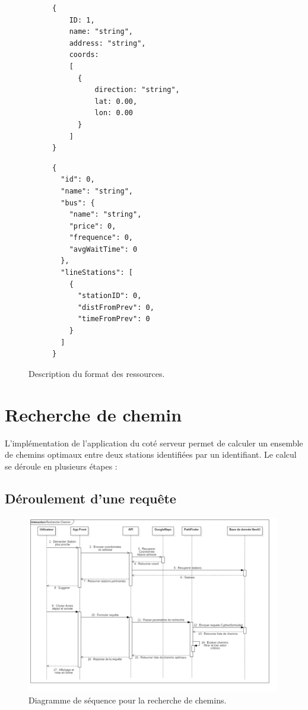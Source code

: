 \begin{figure}[h!]
	\begin{subfigure}[b]{0.45\linewidth}
		\begin{lstlisting}[caption=Format JSON de Station]
{
	ID: 1,
	name: "string",
	address: "string",
	coords: 
	[
	  {
	  	  direction: "string",
  		  lat: 0.00,
   		  lon: 0.00
	  }
	]
}
		\end{lstlisting}
	\end{subfigure}\hfill%
	\begin{subfigure}[b]{0.45\linewidth}
		\begin{lstlisting}[caption=Format JSON de Line]
{
  "id": 0,
  "name": "string",
  "bus": {
    "name": "string",
    "price": 0,
    "frequence": 0,
    "avgWaitTime": 0
  },
  "lineStations": [
    {
      "stationID": 0,
      "distFromPrev": 0,
      "timeFromPrev": 0
    }
  ]
}
		\end{lstlisting}
	\end{subfigure}\hfill%
	\caption{Description du format des ressources.}
	\label{fig:formatResources}
\end{figure}
\newpage
\section{Recherche de chemin}
L'implémentation de l'application du coté serveur permet de calculer un ensemble de chemins optimaux entre deux stations identifiées par un identifiant. Le calcul se déroule en plusieurs étapes :
\subsection{Déroulement d'une requête}

\begin{figure}[h!]
	\center
	\includegraphics[width=0.99\textwidth]{img/RechercheChemin.png}
	\caption{Diagramme de séquence pour la recherche de chemins.}
	\label{fig:diagSequence}
\end{figure}

